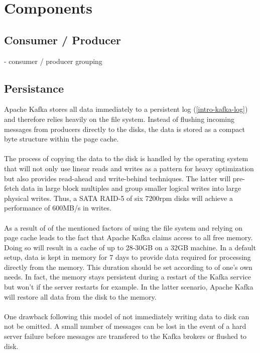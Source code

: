 \section{Components}

\subsection{Consumer / Producer}
- consumer / producer grouping

\subsection{Persistance}
Apache Kafka stores all data immediately to a persistent log
(\ref{intro-kafka-log}) 
and therefore relies heavily on the \gls{file system}.
Instead of flushing incoming messages from producers directly to the disks, the
data is stored as a compact byte structure within the \gls{page cache}.
\\ \\
The process of copying the data to the disk is handled by the operating system
that will not only use linear reads and writes  as a pattern for heavy
optimization but also provides read-ahead and write-behind techniques.
The latter will pre-fetch data in large block multiples and group smaller logical
writes into large physical writes. Thus, a SATA RAID-5 of six 7200rpm
disks will achieve a performance of 600MB/s in writes.
\\ \\
As a result of of the mentioned factors of using the file system and relying on
\gls{page cache} leads to the fact that Apache Kafka claims access to all free memory.
Doing so will result in a cache of up to 28-30GB on a 32GB machine. In a default
setup, data is kept in memory for 7 days to provide data required for processing
directly from the memory. This duration should be set according to of one's own
needs. In fact, the memory stays persistent during a restart of the Kafka
service but won't if the server restarts for example. In the latter scenario,
Apache Kafka will restore all data from the disk to the memory.
\cite{apachekafka} \\ \\
One drawback following this model of not immediately writing data to disk can not be
omitted. A small number of messages can be lost in the event of a hard server
failure before messages are transfered to the Kafka brokers or flushed to disk.
\cite{goodhope2012building}

